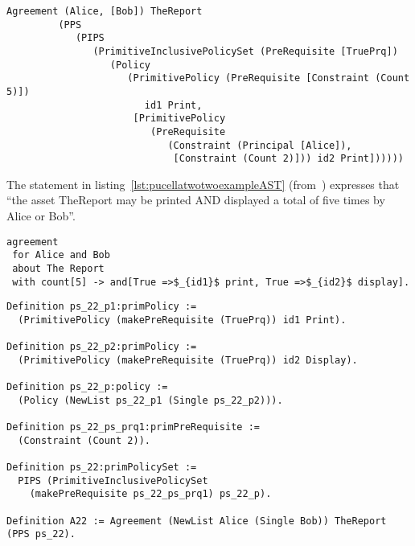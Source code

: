 \begin{minipage}[c]{0.95\textwidth}
\begin{lstlisting}
Agreement (Alice, [Bob]) TheReport
         (PPS
            (PIPS
               (PrimitiveInclusivePolicySet (PreRequisite [TruePrq])
                  (Policy
                     (PrimitivePolicy (PreRequisite [Constraint (Count 5)])
                        id1 Print,
                      [PrimitivePolicy
                         (PreRequisite
                            (Constraint (Principal [Alice]),
                             [Constraint (Count 2)])) id2 Print])))))

\end{lstlisting}
\end{minipage} 















The statement in listing~\ref{lst:pucellatwotwoexampleAST} (from~\cite{pucella2006}) expresses that ``the asset TheReport may be printed AND displayed a total of five times by Alice or Bob''.


\lstset{language=Pucella2006}
\begin{minipage}[c]{0.95\textwidth}
\begin{lstlisting}[frame=single, caption={Agreement of Example 2.2}, label={lst:pucellatwotwoexampleAST}, mathescape]
agreement
 for Alice and Bob 
 about The Report 
 with count[5] -> and[True =>$_{id1}$ print, True =>$_{id2}$ display].
\end{lstlisting}
\end{minipage} 


\begin{minipage}[c]{0.95\textwidth}
\begin{lstlisting}
Definition ps_22_p1:primPolicy := 
  (PrimitivePolicy (makePreRequisite (TruePrq)) id1 Print).

Definition ps_22_p2:primPolicy := 
  (PrimitivePolicy (makePreRequisite (TruePrq)) id2 Display).

Definition ps_22_p:policy := 
  (Policy (NewList ps_22_p1 (Single ps_22_p2))).

Definition ps_22_ps_prq1:primPreRequisite := 
  (Constraint (Count 2)).

Definition ps_22:primPolicySet :=
  PIPS (PrimitiveInclusivePolicySet
    (makePreRequisite ps_22_ps_prq1) ps_22_p).

Definition A22 := Agreement (NewList Alice (Single Bob)) TheReport (PPS ps_22).
		
\end{lstlisting}
\end{minipage} 

